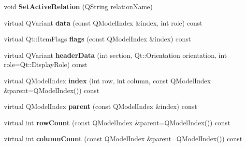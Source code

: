 \begin{DoxyCompactItemize}
\item 
void {\bfseries Set\+Active\+Relation} (Q\+String relation\+Name)\hypertarget{class_extendable_item_model_ad5ce2033c7ba133259dc5c46a98e4694}{}\label{class_extendable_item_model_ad5ce2033c7ba133259dc5c46a98e4694}

\item 
virtual Q\+Variant {\bfseries data} (const Q\+Model\+Index \&index, int role) const \hypertarget{class_extendable_item_model_afaa39ab49a27f730d27e836ef6663985}{}\label{class_extendable_item_model_afaa39ab49a27f730d27e836ef6663985}

\item 
virtual Qt\+::\+Item\+Flags {\bfseries flags} (const Q\+Model\+Index \&index) const \hypertarget{class_extendable_item_model_a56a99de5b70a47e1c9295ad3e4577a67}{}\label{class_extendable_item_model_a56a99de5b70a47e1c9295ad3e4577a67}

\item 
virtual Q\+Variant {\bfseries header\+Data} (int section, Qt\+::\+Orientation orientation, int role=Qt\+::\+Display\+Role) const \hypertarget{class_extendable_item_model_acaa3db5a890e6b3d50a8e89d2e777927}{}\label{class_extendable_item_model_acaa3db5a890e6b3d50a8e89d2e777927}

\item 
virtual Q\+Model\+Index {\bfseries index} (int row, int column, const Q\+Model\+Index \&parent=Q\+Model\+Index()) const \hypertarget{class_extendable_item_model_a4c1dd928c66c449d1c9555e0c18f40f1}{}\label{class_extendable_item_model_a4c1dd928c66c449d1c9555e0c18f40f1}

\item 
virtual Q\+Model\+Index {\bfseries parent} (const Q\+Model\+Index \&index) const \hypertarget{class_extendable_item_model_a1c5f0abfa728c36a12c18c95e85c559a}{}\label{class_extendable_item_model_a1c5f0abfa728c36a12c18c95e85c559a}

\item 
virtual int {\bfseries row\+Count} (const Q\+Model\+Index \&parent=Q\+Model\+Index()) const \hypertarget{class_extendable_item_model_a781c8bb7d7f153bff87aedcd4243985e}{}\label{class_extendable_item_model_a781c8bb7d7f153bff87aedcd4243985e}

\item 
virtual int {\bfseries column\+Count} (const Q\+Model\+Index \&parent=Q\+Model\+Index()) const \hypertarget{class_extendable_item_model_af65d74e580793af236908951af95dfee}{}\label{class_extendable_item_model_af65d74e580793af236908951af95dfee}


\end{DoxyCompactItemize}

